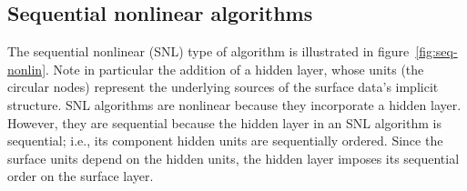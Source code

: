 {%


\subsection{Sequential nonlinear algorithms}
\label{subsec:seq-nonlin}
The sequential nonlinear (SNL) type of algorithm is illustrated in figure~\ref{fig:seq-nonlin}. 
Note in particular the addition of a hidden layer, whose units (the circular nodes)
represent the underlying sources of the surface data's implicit structure.
SNL algorithms are nonlinear because they incorporate a hidden layer.
However, they are sequential because the hidden layer in an SNL algorithm is sequential; i.e., its component hidden units
are sequentially ordered.
Since the surface units depend on the hidden units, the hidden layer imposes its sequential order on the surface layer. 

}
